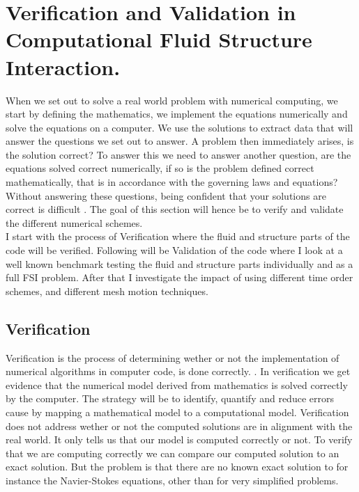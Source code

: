 \chapter{Verification and Validation in Computational Fluid Structure Interaction. }
When we set out to solve a real world problem with numerical computing, we start by defining the mathematics, we implement the equations numerically and solve the equations on a computer. We use the solutions to extract data that will answer the questions we set out to answer. A problem then immediately arises, is the solution correct? To answer this we need to answer another question, are the equations solved correct numerically, if so is the problem defined correct mathematically, that is in accordance with the governing laws and equations?
Without answering these questions, being confident that your solutions are correct is difficult \cite{Selin2014}. The goal of this section will hence be to verify and validate the different numerical schemes. \\

I start with the process of Verification where the fluid and structure parts of the code will be verified. Following will be Validation of the code where I look at a well known benchmark testing the fluid and structure parts individually and as a full FSI problem. After that I investigate the impact of using different time order schemes, and different mesh motion techniques.\newline

\begin{comment}
We start with Verification, which is the process of assessing numerical correctness and accuracy of a computed solution. Then comes Validation, which is assessing physical accuracy of the numerical model, a process which is done by comparing numerical simulation with experimental data. In simple terms we check that we are solving the equations right and then that we are solving the right equations. The process of Verification has to always come before Validation. Because there is no need in checking if we are using the right equations if the equations are not solved right. 
\end{comment}

\section{Verification}
Verification is the process of determining wether or not the implementation of numerical algorithms in computer code, is done correctly. \cite{Oberkampf2010}. 
In verification we get evidence that the numerical model derived from mathematics is solved correctly by the computer. The strategy will be to identify, quantify and reduce errors cause by mapping a mathematical model to a computational model. Verification does not address wether or not the computed solutions are in alignment with the real world. It only tells us that our model is computed correctly or not. To verify that we are computing correctly we can compare our computed solution to an exact solution. But the problem is that there are no known exact solution to for instance the Navier-Stokes equations, other than for very simplified problems. \newline

